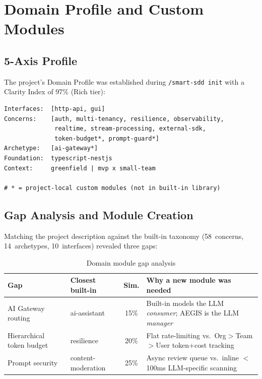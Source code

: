\documentclass[11pt,a4paper,openright,twoside]{report}
\newcommand{\cmd}[1]{\texttt{/#1}}
\begin{document}
\section{Domain Profile and Custom Modules}

\subsection{5-Axis Profile}

The project's Domain Profile was established during \cmd{smart-sdd init} with a Clarity Index of 97\% (Rich tier):

\begin{lstlisting}[style=specstyle, title={AEGIS Domain Profile}]
Interfaces:  [http-api, gui]
Concerns:    [auth, multi-tenancy, resilience, observability,
              realtime, stream-processing, external-sdk,
              token-budget*, prompt-guard*]
Archetype:   [ai-gateway*]
Foundation:  typescript-nestjs
Context:     greenfield | mvp x small-team

# * = project-local custom modules (not in built-in library)
\end{lstlisting}

\subsection{Gap Analysis and Module Creation}

Matching the project description against the built-in taxonomy (58~concerns, 14~archetypes, 10~interfaces) revealed three gaps:

\begin{table}[H]
\centering
\caption{Domain module gap analysis}
\label{tab:aegis-gaps}
\begin{tabularx}{\textwidth}{llcX}
\toprule
\textbf{Gap} & \textbf{Closest built-in} & \textbf{Sim.} & \textbf{Why a new module was needed} \\
\midrule
AI Gateway routing & ai-assistant & 15\% & Built-in models the LLM \emph{consumer}; AEGIS is the LLM \emph{manager} \\
Hierarchical token budget & resilience & 20\% & Flat rate-limiting vs.\ Org$>$Team$>$User token+cost tracking \\
Prompt security & content-moderation & 25\% & Async review queue vs.\ inline $<$100ms LLM-specific scanning \\
\bottomrule
\end{tabularx}
\end{table}
\end{document}
